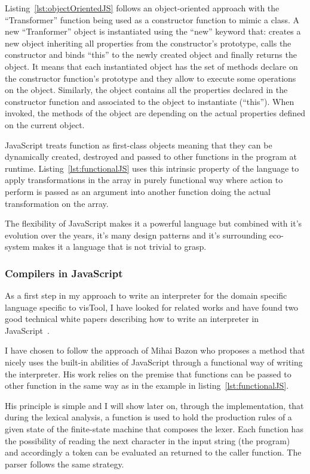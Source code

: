 


Listing~\ref{lst:objectOrientedJS} follows an object-oriented approach with the ``Transformer'' function being used as a constructor function to mimic a class. A new ``Tranformer'' object is instantiated using the ``new'' keyword that: creates a new object inheriting all properties from the constructor's prototype, calls the constructor and binds ``this'' to the newly created object and finally returns the object. It means that each instantiated object has the set of methods declare on the constructor function's prototype and they allow to execute some operations on the object. Similarly, the object contains all the properties declared in the constructor function and associated to the object to instantiate (``this''). When invoked, the methods of the object are depending on the actual properties defined on the current object.

JavaScript treats function as first-class objects meaning that they can be dynamically created, destroyed and passed to other functions in the program at runtime. Listing~\ref{lst:functionalJS} uses this intrinsic property of the language to apply transformations in the array in purely functional way where action to perform is passed as an argument into another function doing the actual transformation on the array.

The flexibility of JavaScript makes it a powerful language but combined with it's evolution over the years, it's many design patterns and it's surrounding eco-system makes it a language that is not trivial to grasp.

\subsubsection{Compilers in JavaScript}

As a first step in my approach to write an interpreter for the domain specific language specific to visTool, I have looked for related works and have found two good technical white papers describing how to write an interpreter in JavaScript~\cite{crockford2007}\cite{bazon16}.

I have chosen to follow the approach of Mihai Bazon who proposes a method that nicely uses the built-in abilities of JavaScript through a functional way of writing the interpreter. His work relies on the premise that functions can be passed to other function in the same way as in the example in listing~\ref{lst:functionalJS}.

His principle is simple and I will show later on, through the implementation, that during the lexical analysis, a function is used to hold the production rules of a given state of the finite-state machine that composes the lexer. Each function has the possibility of reading the next character in the input string (the program) and accordingly a token can be evaluated an returned to the caller function. The parser follows the same strategy.